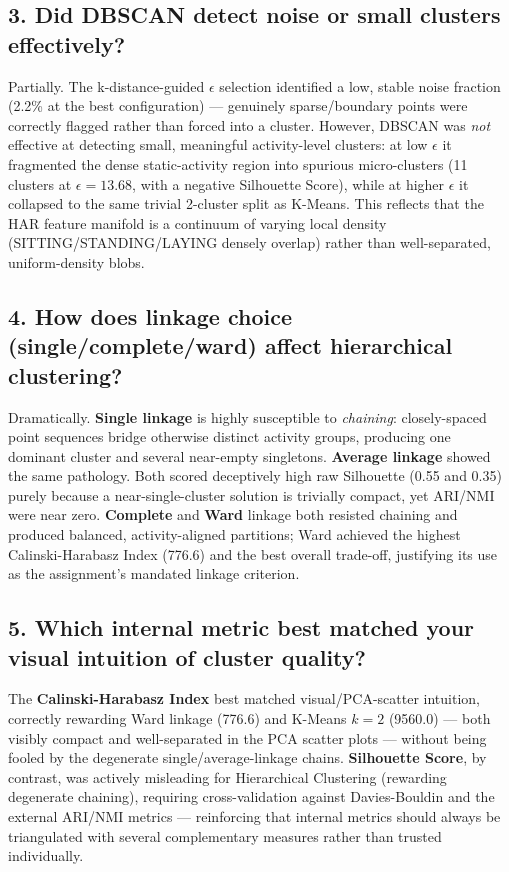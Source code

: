 \documentclass[12pt,a4paper]{article}
\begin{document}
\subsection{3. Did DBSCAN detect noise or small clusters effectively?}
Partially. The k-distance-guided $\epsilon$ selection identified a low, stable noise fraction (2.2\% at the best configuration) — genuinely sparse/boundary points were correctly flagged rather than forced into a cluster. However, DBSCAN was \textit{not} effective at detecting small, meaningful activity-level clusters: at low $\epsilon$ it fragmented the dense static-activity region into spurious micro-clusters (11 clusters at $\epsilon=13.68$, with a negative Silhouette Score), while at higher $\epsilon$ it collapsed to the same trivial 2-cluster split as K-Means. This reflects that the HAR feature manifold is a continuum of varying local density (SITTING/STANDING/LAYING densely overlap) rather than well-separated, uniform-density blobs.

\subsection{4. How does linkage choice (single/complete/ward) affect hierarchical clustering?}
Dramatically. \textbf{Single linkage} is highly susceptible to \textit{chaining}: closely-spaced point sequences bridge otherwise distinct activity groups, producing one dominant cluster and several near-empty singletons. \textbf{Average linkage} showed the same pathology. Both scored deceptively high raw Silhouette (0.55 and 0.35) purely because a near-single-cluster solution is trivially compact, yet ARI/NMI were near zero. \textbf{Complete} and \textbf{Ward} linkage both resisted chaining and produced balanced, activity-aligned partitions; Ward achieved the highest Calinski-Harabasz Index (776.6) and the best overall trade-off, justifying its use as the assignment's mandated linkage criterion.

\subsection{5. Which internal metric best matched your visual intuition of cluster quality?}
The \textbf{Calinski-Harabasz Index} best matched visual/PCA-scatter intuition, correctly rewarding Ward linkage (776.6) and K-Means $k=2$ (9560.0) — both visibly compact and well-separated in the PCA scatter plots — without being fooled by the degenerate single/average-linkage chains. \textbf{Silhouette Score}, by contrast, was actively misleading for Hierarchical Clustering (rewarding degenerate chaining), requiring cross-validation against Davies-Bouldin and the external ARI/NMI metrics — reinforcing that internal metrics should always be triangulated with several complementary measures rather than trusted individually.
\end{document}
